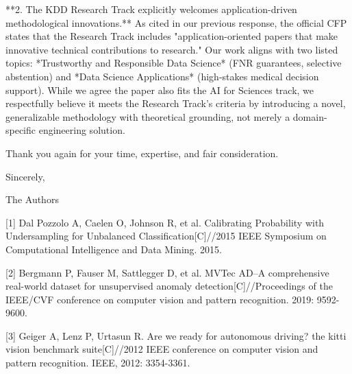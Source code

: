 \documentclass[UTF8,12pt]{article}
\begin{document}
**2. The KDD Research Track explicitly welcomes application-driven methodological innovations.**  
As cited in our previous response, the official CFP states that the Research Track includes "application-oriented papers that make innovative technical contributions to research." Our work aligns with two listed topics: *Trustworthy and Responsible Data Science* (FNR guarantees, selective abstention) and *Data Science Applications* (high-stakes medical decision support). While we agree the paper also fits the AI for Sciences track, we respectfully believe it meets the Research Track's criteria by introducing a novel, generalizable methodology with theoretical grounding, not merely a domain-specific engineering solution.

Thank you again for your time, expertise, and fair consideration.

Sincerely, 

The Authors

[1] Dal Pozzolo A, Caelen O, Johnson R, et al. Calibrating Probability with Undersampling for Unbalanced Classification[C]//2015 IEEE Symposium on Computational Intelligence and Data Mining. 2015.

[2] Bergmann P, Fauser M, Sattlegger D, et al. MVTec AD--A comprehensive real-world dataset for unsupervised anomaly detection[C]//Proceedings of the IEEE/CVF conference on computer vision and pattern recognition. 2019: 9592-9600.

[3] Geiger A, Lenz P, Urtasun R. Are we ready for autonomous driving? the kitti vision benchmark suite[C]//2012 IEEE conference on computer vision and pattern recognition. IEEE, 2012: 3354-3361.
\end{document}
